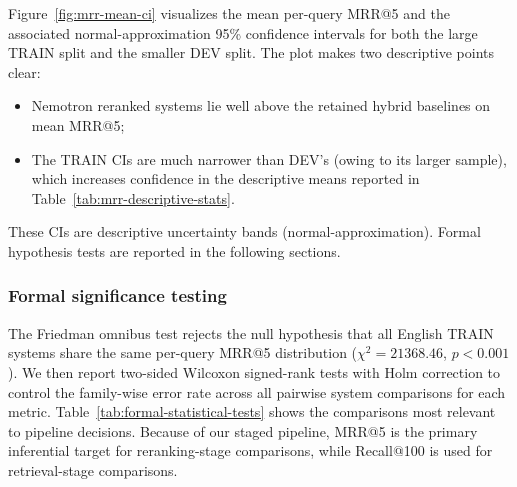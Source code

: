Figure~\ref{fig:mrr-mean-ci} visualizes the mean per-query MRR@5 and the associated normal-approximation 95\% confidence intervals for both the large TRAIN split and the smaller DEV split. The plot makes two descriptive points clear:
\begin{itemize}
    \item Nemotron reranked systems lie well above the retained hybrid baselines on mean MRR@5;
    \item The TRAIN CIs are much narrower than DEV's (owing to its larger sample), which increases confidence in the descriptive means reported in Table~\ref{tab:mrr-descriptive-stats}.
\end{itemize}

These CIs are descriptive uncertainty bands (normal-approximation). Formal hypothesis tests are reported in the following sections.

\subsubsection{Formal significance testing}

The Friedman omnibus test rejects the null hypothesis that all English TRAIN systems share the same per-query MRR@5 distribution ($\chi^2=21368.46$, $p<0.001$). We then report two-sided Wilcoxon signed-rank tests with Holm correction to control the family-wise error rate across all pairwise system comparisons for each metric. Table~\ref{tab:formal-statistical-tests} shows the comparisons most relevant to pipeline decisions. Because of our staged pipeline, MRR@5 is the primary inferential target for reranking-stage comparisons, while Recall@100 is used for retrieval-stage comparisons.

